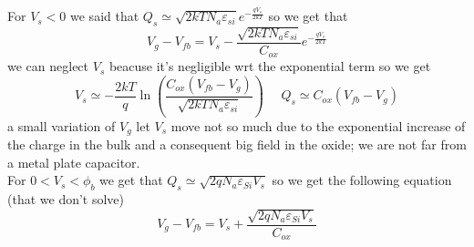 \vspace{5mm}
For $V_s<0$ we said that  $Q_s\simeq \sqrt{2kTN_a\varepsilon_{si}}e^{-\frac{qV_s}{2kT}}$ so we get that
\begin{equation}
V_g-V_{fb}=V_s-\frac{\sqrt{2kTN_a\varepsilon_{si}}}{C_{ox}}e^{-\frac{qV_s}{2kT}}
\end{equation} 
we can neglect $V_s$ beacuse it's negligible wrt the exponential term so we get 
\begin{equation}
V_s\simeq-\frac{2kT}{q}\ln\left(\frac{C_{ox}(V_{fb}-V_g)}{\sqrt{2kTN_a\varepsilon_{si}}} \right) \ \ \ \ \ \ Q_s\simeq C_{ox}(V_{fb}-V_g)
\end{equation}
a small variation of $V_g$ let $V_s$ move not so much due to the exponential increase of the charge in the bulk and a consequent big field in the oxide; we are not far from a metal plate capacitor.\\

\vspace{5mm}
For $0<V_s<\phi_b$ we get that $Q_s\simeq \sqrt{2qN_a\varepsilon_{Si}V_s}$ so we get the following equation (that we don't solve)
\begin{equation}
V_g-V_{fb}=V_s+\frac{\sqrt{2qN_a\varepsilon_{Si}V_s}}{C_{ox}}
\end{equation}

\vspace{5mm}

{\begin{center} 
\end{center}}



